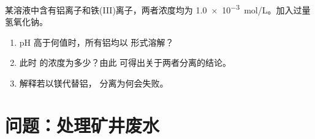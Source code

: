 \begin{exercise}[$\star\star\star$]\label{exo:b1:precipitation:12}
某溶液中含有铝离子和铁(III)离子，两者浓度均为
\qty{1.0e-3}{mol/L}。加入过量氢氧化钠。
\begin{enumerate}
  \item pH 高于何值时，所有铝均以  形式溶解？
  \item 此时  的浓度为多少？由此
        可得出关于两者分离的结论。
  \item 解释若以镁代替铝，
        分离为何会失败。
\end{enumerate}
\end{exercise}

\section{问题：处理矿井废水}

